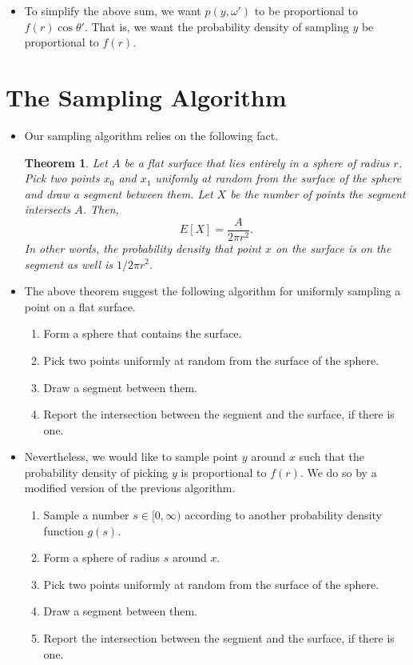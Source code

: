 \documentclass[10pt]{article}
\newtheorem{theorem}[lemma]{Theorem}
\begin{document}
\begin{itemize}
	\item To simplify the above sum, we want $p(y,\omega')$ to be 
	proportional to  $f(r) \cos \theta'$. That is, we want the 
	probability density of sampling $y$ be proportional to
	$f(r)$.
\end{itemize}

\section{The Sampling Algorithm}

\begin{itemize}
	\item Our sampling algorithm relies on the following fact.
	\begin{theorem} \label{intersection-sampling}
		Let $A$ be a flat surface that lies entirely in a
		sphere of radius $r$. 
		Pick two points $x_0$ and $x_1$ unifomly at random from 
		the surface of the sphere and draw a segment between them. 		
		Let $X$ be the number of points the segment intersects $A$. Then, 
		$$E[X] = \frac{A}{2\pi r^2}.$$
		In other words, the probability density that point $x$
		on the surface is on the segment as well is $1 / 2\pi r^2.$
	\end{theorem}	

	\item The above theorem suggest the following algorithm for uniformly
	sampling a point on a flat surface.	
		\begin{enumerate}
			\item Form a sphere that contains the surface.
			\item Pick two points uniformly at random from the surface of
				the sphere.
			\item Draw a segment between them.
			\item Report the intersection between the segment and the surface, 
				if there is one.
		\end{enumerate}
	
	\item Nevertheless, we would like to sample point $y$ around $x$ 
	such that the probability density of picking $y$ is proportional to 
	$f(r)$. We do so
	by a modified version of the previous algorithm.
		\begin{enumerate}
			\item Sample a number $s \in [0, \infty)$ according to
				another probability density function $g(s)$.
			\item Form a sphere of radius $s$ around $x$.
			\item Pick two points uniformly at random from the surface of
				the sphere.
			\item Draw a segment between them.
			\item Report the intersection between the segment and the surface, 
				if there is one.
		\end{enumerate}
		

\end{itemize}
\end{document}
